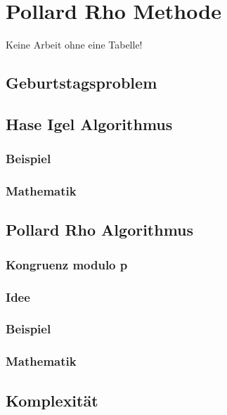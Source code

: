  
 	\section{Pollard Rho Methode}
 	\label{sec:pollard}
 	Keine Arbeit ohne eine Tabelle!
 	\subsection{Geburtstagsproblem}
 	\subsection{Hase Igel Algorithmus}
 	\subsubsection{Beispiel}
 	\subsubsection{Mathematik}
 	\subsection{Pollard Rho Algorithmus}
 	\subsubsection{Kongruenz modulo p}
 	\subsubsection{Idee}
 	\subsubsection{Beispiel}
 	\subsubsection{Mathematik}
 	\subsection{Komplexit\"at}	